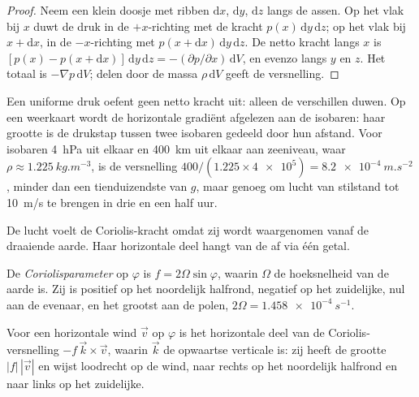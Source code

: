 \begin{proof}
Neem een klein doosje met ribben $\mathrm dx$, $\mathrm dy$, $\mathrm dz$ langs de assen. Op het vlak bij $x$ duwt de druk in de $+x$-richting met de kracht $p(x)\,\mathrm dy\,\mathrm dz$; op het vlak bij $x + \mathrm dx$, in de $-x$-richting met $p(x + \mathrm dx)\,\mathrm dy\,\mathrm dz$. De netto kracht langs $x$ is $[p(x) - p(x + \mathrm dx)]\,\mathrm dy\,\mathrm dz = -(\partial p/\partial
x)\,\mathrm dV$, en evenzo langs $y$ en $z$. Het totaal is $-\nabla p\,
\mathrm dV$; delen door de massa $\rho\,\mathrm dV$ geeft de versnelling.
\end{proof}

Een uniforme druk oefent geen netto kracht uit: alleen de verschillen duwen. Op een weerkaart wordt de horizontale gradiënt afgelezen aan de isobaren: haar grootte is de drukstap tussen twee isobaren gedeeld door hun afstand. Voor isobaren \qty{4}{hPa} uit elkaar en \qty{400}{km} uit elkaar aan zeeniveau, waar $\rho \approx \qty{1.225}{kg.m^{-3}}$, is de versnelling $400/(1.225 \times \num{4e5}) = \qty{8.2e-4}{m.s^{-2}}$, minder dan een tienduizendste van $g$, maar genoeg om lucht van stilstand tot \qty{10}{m/s} te brengen in drie en een half uur.

De lucht voelt de Coriolis-kracht omdat zij wordt waargenomen vanaf de draaiende aarde. Haar horizontale deel hangt van de  af via één getal.

\begin{definition}[Coriolisparameter]\label{def:b1:atmospheric-circulation:coriolis-parameter}
De \emph{Coriolisparameter} op  $\varphi$ is $f = 2\Omega\sin\varphi$, waarin $\Omega$ de hoeksnelheid van de aarde is. Zij is positief op het noordelijk halfrond, negatief op het zuidelijke, nul aan de evenaar, en het grootst aan de polen, $2\Omega = \qty{1.458e-4}{s^{-1}}$.
\end{definition}

\begin{proposition}\label{prop:b1:atmospheric-circulation:coriolis}
Voor een horizontale wind $\vec v$ op  $\varphi$ is het horizontale deel van de Coriolis-versnelling $-f\,\vec k\times\vec v$, waarin $\vec k$ de opwaartse verticale is: zij heeft de grootte $|f|\,|\vec v|$ en wijst loodrecht op de wind, naar rechts op het noordelijk halfrond en naar links op het zuidelijke.
\end{proposition}

